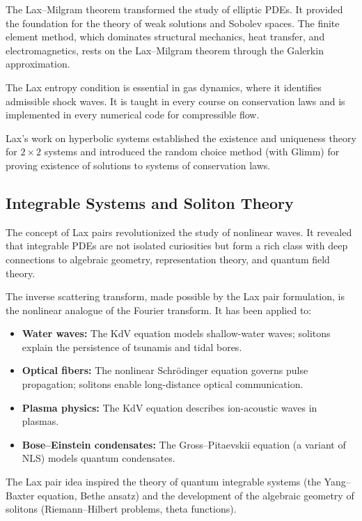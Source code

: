 The Lax--Milgram theorem transformed the study of elliptic PDEs. It provided the foundation for the theory of weak solutions and Sobolev spaces. The finite element method, which dominates structural mechanics, heat transfer, and electromagnetics, rests on the Lax--Milgram theorem through the Galerkin approximation.

The Lax entropy condition is essential in gas dynamics, where it identifies admissible shock waves. It is taught in every course on conservation laws and is implemented in every numerical code for compressible flow.

Lax's work on hyperbolic systems established the existence and uniqueness theory for \(2 \times 2\) systems and introduced the random choice method (with Glimm) for proving existence of solutions to systems of conservation laws.

\subsection{Integrable Systems and Soliton Theory}

The concept of Lax pairs revolutionized the study of nonlinear waves. It revealed that integrable PDEs are not isolated curiosities but form a rich class with deep connections to algebraic geometry, representation theory, and quantum field theory.

The inverse scattering transform, made possible by the Lax pair formulation, is the nonlinear analogue of the Fourier transform. It has been applied to:
\begin{itemize}
    \item \textbf{Water waves:} The KdV equation models shallow-water waves; solitons explain the persistence of tsunamis and tidal bores.
    \item \textbf{Optical fibers:} The nonlinear Schr\"odinger equation governs pulse propagation; solitons enable long-distance optical communication.
    \item \textbf{Plasma physics:} The KdV equation describes ion-acoustic waves in plasmas.
    \item \textbf{Bose--Einstein condensates:} The Gross--Pitaevskii equation (a variant of NLS) models quantum condensates.
\end{itemize}

The Lax pair idea inspired the theory of quantum integrable systems (the Yang--Baxter equation, Bethe ansatz) and the development of the algebraic geometry of solitons (Riemann--Hilbert problems, theta functions).


